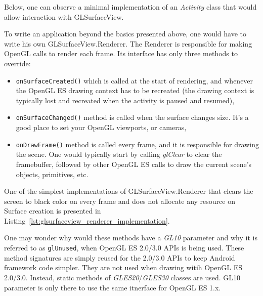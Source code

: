 Below, one can observe a minimal implementation of an \emph{Activity} class \cite{android_activity} that would allow interaction with GLSurfaceView.

%
\begin{filecode}[label=lst:opengl_es_activity,caption=Minimal implementation of Android's Activity class that would use GLSurfaceView.]
  
\end{filecode}

To write an application beyond the basics presented above, one would have to write his own GLSurfaceView.Renderer. The Renderer is responsible for making OpenGL calls to render each frame.
Its interface has only three methods to override:

\begin{itemize}
\item \texttt{onSurfaceCreated()} which is called at the start of rendering, and whenever the OpenGL ES drawing context has to be recreated (the drawing context is typically lost and recreated when the activity is paused and resumed),
\item \texttt{onSurfaceChanged()} method is called when the surface changes size. It's a good place to set your OpenGL viewports, or cameras,
\item \texttt{onDrawFrame()} method is called every frame, and it is responsible for drawing the scene. One would typically start by calling \emph{glClear} to clear the framebuffer, followed by other OpenGL ES calls to draw the current scene's objects, primitives, etc.
\end{itemize}

\pagebreak[3]
One of the simplest implementations of GLSurfaceView.Renderer that clears the screen to black color on every frame and does not allocate any resource on Surface creation is presented in Listing~\ref{lst:glsurfaceview_renderer_implementation}.


\begin{note}
{One may wonder why would these methods have a \emph{GL10} parameter and why it is referred to as \texttt{glUnused}, when OpenGL ES 2.0/3.0 APIs is being used.
These method signatures are simply reused for the 2.0/3.0 APIs to keep Android framework code simpler.
They are not used when drawing witih OpenGL ES 2.0/3.0.
Instead, static methods of \emph{GLES20}/\emph{GLES30} classes are used.
GL10 parameter is only there to use the same itnerface for OpenGL ES 1.x.
}
\end{note}

